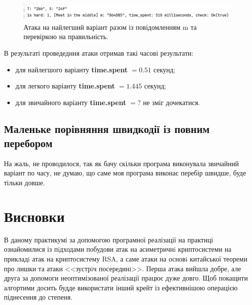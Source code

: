 \begin{figure}[!h]
            \centering
            \includegraphics[scale=0.4]{Images/meet_in_middle_easiest.png}
            \caption{Атака на найлегший варіант разом із повідомленням m та перевіркою на правильність.}
            \label{fig:middle_easy}
        \end{figure}


В результаті проведедння атаки отримав такі часові результати:
\begin{itemize}
    \item для найлегшого варіанту \textbf{time.spent} $=0.51$ секунд; 
    \item для легкого варіанту \textbf{time.spent} $=1.445$ секунд;  
    \item для звичайного варіанту \textbf{time.spent} $=?$ не зміг дочекатися.
\end{itemize}

\subsection{Маленьке порівняння швидкодії із повним перебором}
На жаль, не проводилося, так як бачу скільки програма виконувала звичайний варіант по часу, не думаю, що саме моя програма виконає перебір швидше, буде тільки довше.

\section{Висновки}
В даному практикумі за допомогою програмної реалізації на практиці ознайомилися із пiдходами побудови атак на асиметричнi криптосистеми на прикладi атак на криптосистему RSA, а саме атаки на основi китайської теореми про лишки та атаки <<зустрiч посерединi>>. Перша атака вийшла добре, але друга за допомоги неоптимізованої реалізації працює дуже довго. Щоб покащити алгортими досить будде використати інший крейт із ефективнішою операцією піднесення до степеня.
